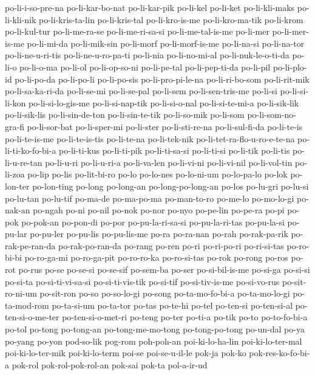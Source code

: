 {po-li-i-so-pre-na po-li-kar-bo-nat po-li-kar-pik po-li-kel po-li-ket
po-li-kli-maks po-li-kli-nik po-li-kris-ta-lin po-li-kris-tal
po-li-kro-is-me po-li-kro-ma-tik po-li-krom po-li-kul-tur po-li-me-ra-se
po-li-me-ri-sa-si po-li-me-tal-is-me po-li-mer po-li-mer-is-me po-li-mi-da
po-li-mik-sin po-li-morf po-li-morf-is-me po-li-na-si po-li-na-tor
po-li-ne-u-ri-tis po-li-ne-u-ro-pa-ti po-li-nia po-li-no-mi-al
po-li-nuk-le-o-ti-da po-li-o po-li-o-ma po-li-ol po-li-op-so-ni
po-li-pe-tal po-li-pep-ti-da po-li-pil po-li-plo-id po-li-po-da
po-li-po-li po-li-po-sis po-li-pro-pi-le-na po-li-ri-bo-som po-li-rit-mik
po-li-sa-ka-ri-da po-li-se-mi po-li-se-pal po-li-sem po-li-sen-tris-me
po-li-si po-li-si-li-kon po-li-si-lo-gis-me po-li-si-nap-tik
po-li-si-o-nal po-li-si-te-mi-a po-li-sik-lik po-li-sik-lis
po-li-sin-de-ton po-li-sin-te-tik po-li-so-mik po-li-som
po-li-som-no-gra-fi po-li-sor-bat po-li-sper-mi po-li-ster po-li-sti-re-na
po-li-sul-fi-da po-li-te-is po-li-te-is-me po-li-te-is-tis po-li-te-na
po-li-tek-nik po-li-tet-ra-flo-u-ro-e-te-na po-li-ti-ko-fo-bi-a
po-li-ti-kus po-li-ti-pik po-li-ti-sa-si po-li-ti-si po-li-tik po-li-tis
po-li-u-re-tan po-li-u-ri po-li-u-ri-a po-li-va-len po-li-vi-ni
po-li-vi-nil po-li-vol-tin po-li-zoa po-lip po-lis po-lit-bi-ro po-lo
po-lo-nes po-lo-ni-um po-lo-pa-lo po-lok po-lon-ter po-lon-ting po-long
po-long-an po-long-po-long-an po-los po-lu-gri po-lu-si po-lu-tan
po-lu-tif po-ma-de po-ma-po-ma po-man-to-ro po-me-lo po-mo-lo-gi po-nak-an
po-ngah po-ni po-nil po-nok po-nor po-nyo po-pe-lin po-pe-ra po-pi po-pok
po-pok-an po-pon-di po-por po-pu-la-ri-sa-si po-pu-la-ri-tas po-pu-la-si
po-pu-lar po-pu-ler po-pu-lis po-pu-lis-me po-ra po-ra-nan po-rah
po-rak-pa-rik po-rak-pe-ran-da po-rak-po-ran-da po-rang po-ren po-ri
po-ri-po-ri po-ri-si-tas po-ro-bi-bi po-ro-ga-mi po-ro-ga-pit po-ro-ro-ka
po-ro-si-tas po-rok po-rong po-ros po-rot po-rus po-se po-se-si po-se-sif
po-sem-ba po-ser po-si-bil-is-me po-si-ga po-si-si po-si-ta
po-si-ti-vi-sa-si po-si-ti-vis-tik po-si-tif po-si-tiv-is-me po-si-vo-rus
po-sit-ro-ni-um po-sit-ron po-so po-so-lo-gi po-song po-ta-mo-fo-bi-a
po-ta-mo-lo-gi po-ta-mod-rom po-ta-si-um po-ta-tor po-tas po-te-hi po-tel
po-ten-si po-ten-si-al po-ten-si-o-me-ter po-ten-si-o-met-ri po-teng
po-ter po-ti-a po-tik po-to po-to-fo-bi-a po-tol po-tong po-tong-an
po-tong-me-mo-tong po-tong-po-tong po-un-dal po-ya po-yang po-yon
pod-so-lik pog-rom poh-poh-an poi-ki-lo-ha-lin poi-ki-lo-ter-mal
poi-ki-lo-ter-mik poi-ki-lo-term poi-se poi-se-u-il-le pok-ja pok-ko
pok-res-ko-fo-bi-a pok-rol pok-rol-pok-rol-an pok-sai pok-ta pol-a-ir-ud
}

